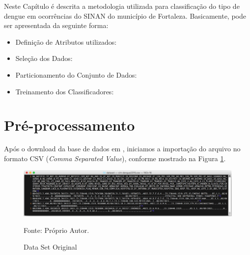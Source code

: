 \documentclass[
	12pt,				%
	openright,			%
	oneside,	
	a4paper,				%
	english,				%
	brazil				%
]{abntex2/abntex2} %
\begin{document}

	Neste Capítulo é descrita a metodologia utilizada para classificação do tipo de dengue em ocorrências do SINAN do município de Fortaleza. Basicamente, pode ser apresentada da seguinte forma:
	\begin{itemize}
		\item Definição de Atributos utilizados: 
		\item Seleção dos Dados:
		\item Particionamento do Conjunto de Dados:
		\item Treinamento dos Classificadores:
	\end{itemize}

	\section{Pré-processamento}
	
	Após o download da base de dados em \cite{fortaleza:2015},  iniciamos a importação do arquivo no formato CSV (\textit{Comma Separated Value}), conforme mostrado na Figura \ref{figdataSetOriginal}.
	
		
		\begin{figure}[!htb]
			\caption{\label{figdataSetOriginal} Data Set Original}
			\begin{center}
				\includegraphics[scale=0.4]{img/dataSetOriginal.png}
			\end{center}
			Fonte: Próprio Autor.
		\end{figure}
	
\end{document}
